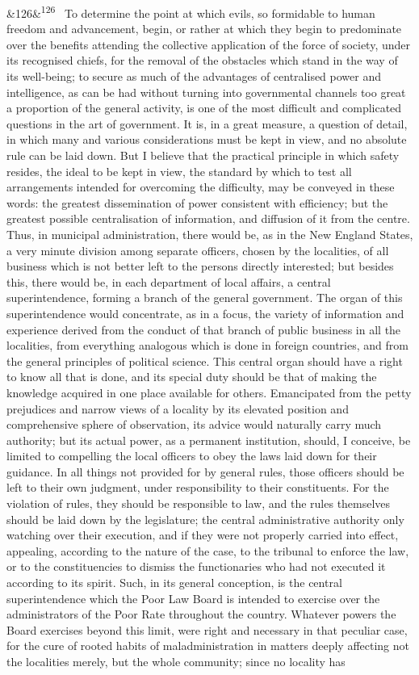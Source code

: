 \documentclass[12pt]{article}
\newcommand{\para}[1][]{\par\noindent\ifx&#1&\else\textsuperscript{\footnotesize #1}~\fi}
\begin{document}
\para[126] To determine the point at which evils, so formidable to human freedom and advancement, begin, or rather at which they begin to predominate over the benefits attending the collective application of the force of society, under its recognised chiefs, for the removal of the obstacles which stand in the way of its well-being; to secure as much of the advantages of centralised power and intelligence, as can be had without turning into governmental channels too great a proportion of the general activity, is one of the most difficult and complicated questions in the art of government. It is, in a great measure, a question of detail, in which many and various considerations must be kept in view, and no absolute rule can be laid down. But I believe that the practical principle in which safety resides, the ideal to be kept in view, the standard by which to test all arrangements intended for overcoming the difficulty, may be conveyed in these words: the greatest dissemination of power consistent with efficiency; but the greatest possible centralisation of information, and diffusion of it from the centre. Thus, in municipal administration, there would be, as in the New England States, a very minute division among separate officers, chosen by the localities, of all business which is not better left to the persons directly interested; but besides this, there would be, in each department of local affairs, a central superintendence, forming a branch of the general government. The organ of this superintendence would concentrate, as in a focus, the variety of information and experience derived from the conduct of that branch of public business in all the localities, from everything analogous which is done in foreign countries, and from the general principles of political science. This central organ should have a right to know all that is done, and its special duty should be that of making the knowledge acquired in one place available for others. Emancipated from the petty prejudices and narrow views of a locality by its elevated position and comprehensive sphere of observation, its advice would naturally carry much authority; but its actual power, as a permanent institution, should, I conceive, be limited to compelling the local officers to obey the laws laid down for their guidance. In all things not provided for by general rules, those officers should be left to their own judgment, under responsibility to their constituents. For the violation of rules, they should be responsible to law, and the rules themselves should be laid down by the legislature; the central administrative authority only watching over their execution, and if they were not properly carried into effect, appealing, according to the nature of the case, to the tribunal to enforce the law, or to the constituencies to dismiss the functionaries who had not executed it according to its spirit. Such, in its general conception, is the central superintendence which the Poor Law Board is intended to exercise over the administrators of the Poor Rate throughout the country. Whatever powers the Board exercises beyond this limit, were right and necessary in that peculiar case, for the cure of rooted habits of maladministration in matters deeply affecting not the localities merely, but the whole community; since no locality has 
\end{document}
